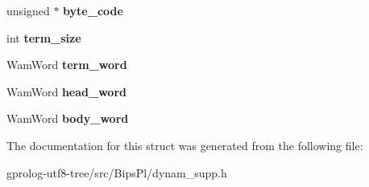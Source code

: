 \begin{DoxyCompactItemize}
\item 
unsigned $\ast$ {\bfseries byte\+\_\+code}\hypertarget{structdyncinf_a8a16574f97f5162a42cf11f74b16d6b3}{}\label{structdyncinf_a8a16574f97f5162a42cf11f74b16d6b3}

\item 
int {\bfseries term\+\_\+size}\hypertarget{structdyncinf_a4b49c8e104c686701eb19ca0d01173e7}{}\label{structdyncinf_a4b49c8e104c686701eb19ca0d01173e7}

\item 
Wam\+Word {\bfseries term\+\_\+word}\hypertarget{structdyncinf_aad9f2ad962d3ca3002a6fc97dc375d0b}{}\label{structdyncinf_aad9f2ad962d3ca3002a6fc97dc375d0b}

\item 
Wam\+Word {\bfseries head\+\_\+word}\hypertarget{structdyncinf_a11e4b16031cc5023d2f6d2194e328b89}{}\label{structdyncinf_a11e4b16031cc5023d2f6d2194e328b89}

\item 
Wam\+Word {\bfseries body\+\_\+word}\hypertarget{structdyncinf_aaab182b28b71abea34aa78e530aa9483}{}\label{structdyncinf_aaab182b28b71abea34aa78e530aa9483}

\end{DoxyCompactItemize}


The documentation for this struct was generated from the following file\+:\begin{DoxyCompactItemize}
\item 
gprolog-\/utf8-\/tree/src/\+Bips\+Pl/dynam\+\_\+supp.\+h\end{DoxyCompactItemize}
